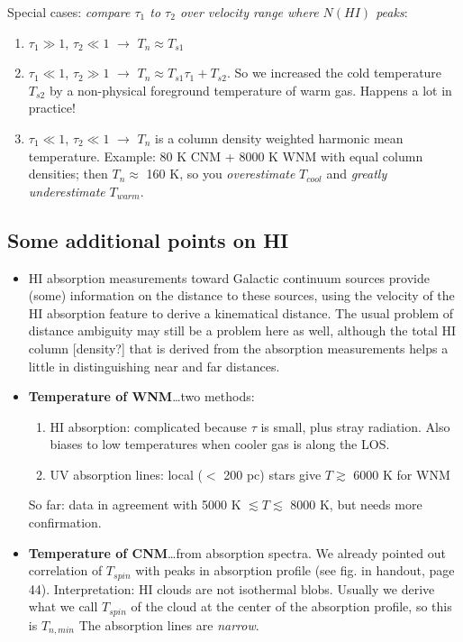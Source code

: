 \documentclass[11pt]{article}
\newcommand{\mar}[1]{\hspace{0pt}\marginpar{-\textcolor{black}{#1}-}}
\newcommand{\mynotes}[1]{{\fontfamily{cmss}\selectfont \textit{#1}}}
\begin{document}
Special cases: \mynotes{compare $\tau_{1}$ to $\tau_{2}$ over velocity range
where $N(HI)$ peaks}:
\begin{enumerate}
    \item $\tau_{1} \gg 1$, $\tau_{2} \ll 1$ $\rightarrow$ $T_{n} \approx T_{s1}$
    \item $\tau_{1} \ll 1$, $\tau_{2} \gg 1$ $\rightarrow$
        $T_{n} \approx T_{s1}\tau_{1} + T_{s2}$. So we increased the cold
        temperature $T_{s2}$ by a non-physical foreground temperature of warm
        gas. Happens a lot in practice!
    \item $\tau_{1} \ll 1$, $\tau_{2} \ll 1$ $\rightarrow$ $T_{n}$ is a
        column density weighted harmonic mean temperature. Example: 80 K CNM +
        8000 K WNM with equal column densities; then $T_{n} \approx$ 160 K,
        so you \emph{overestimate} $T_{cool}$ and \emph{greatly underestimate}
        $T_{warm}$.
\end{enumerate}

\subsection{Some additional points on HI}
\mar{49}
\begin{itemize}
    \item HI absorption measurements toward Galactic continuum sources provide (some)
        information on the distance to these sources, using the velocity of the HI
        absorption feature to derive a kinematical distance. The usual problem of
        distance ambiguity may still be a problem here as well, although the total
        HI column [density?] that is derived from the absorption measurements helps
        a little in distinguishing near and far distances.
    \item \textbf{Temperature of WNM}\ldots two methods:
        \begin{enumerate}
            \item HI absorption: complicated because $\tau$ is small, plus stray
                radiation. Also biases to low temperatures when cooler gas is
                along the LOS\@.
            \item UV absorption lines: local ($<$ 200 pc) stars give
            $T \gtrsim$ 6000 K for WNM
        \end{enumerate}
        So far: data in agreement with 5000 K $\lesssim T \lesssim$ 8000 K,
        but needs more confirmation.
    \item \textbf{Temperature of CNM}\ldots from absorption spectra.
        We already pointed out correlation of $T_{spin}$ with peaks in
        absorption profile (see fig. in handout, page 44). Interpretation: HI
        clouds are not isothermal blobs. Usually we derive what we call
        $T_{spin}$ of the cloud at the center of the absorption profile, so this
        is $T_{n, min}$
        \mar{50}The absorption lines are \emph{narrow}.
\end{itemize}
\end{document}
